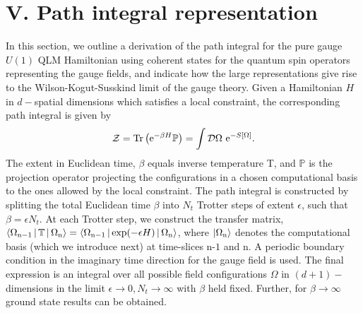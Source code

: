 \documentclass[aps,prl,reprint,twocolumn,superscriptaddress,floatfix,nofootinbib]{revtex4-1}
\begin{document}
\section{V. Path integral representation}
In this section, we outline a derivation of the path integral for the pure gauge $U(1)$ QLM Hamiltonian using coherent states for the quantum spin operators representing the gauge fields, and indicate how the large representations give rise to the Wilson-Kogut-Susskind limit of the gauge theory. Given a Hamiltonian $H$ in $d-$spatial dimensions which satisfies a local constraint, the corresponding path integral is given by 
\begin{equation}
	{\cal{Z}} = \text{Tr} \left( \text{e}^{-\beta H}\mathbb{P} \right) 
	= \int \mathcal{D} \Omega ~ \text{e}^{-S [\Omega]}.
\end{equation}
The extent in Euclidean time, $\beta$ equals inverse temperature T, and $\mathbb{P}$ is the projection operator projecting the configurations in a chosen computational basis to the ones allowed by the local constraint. The path integral is constructed by splitting the total Euclidean time $\beta$ into $N_t$ Trotter steps of extent $\epsilon$, such that $\beta = \epsilon N_t$. At each Trotter step, we construct the transfer matrix, $\Braket{\Omega_{\rm n-1}| \mathbb{T} | \Omega_{\rm n} } = \Braket{\Omega_{\rm n-1}| \text{exp} (-\epsilon H) | \Omega_{\rm n} } $, where $\ket{\Omega_{\rm n}}$ denotes the computational basis (which we introduce next) at time-slices $\text{n-1}$ and $\text{n}$. A periodic boundary condition in the imaginary time direction for the gauge field is used. The final expression is an integral over all possible field configurations $\Omega$ in $(d+1)-$dimensions in the limit $\epsilon \to 0, N_t \to \infty$ with $\beta$ held fixed. Further, for $\beta \to \infty$ ground state results can be obtained.
\end{document}

